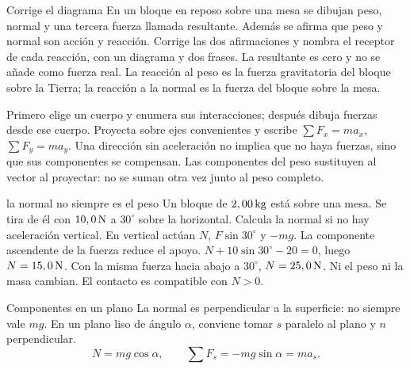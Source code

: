 \documentclass[11pt,a4paper]{article}
\begin{document}
\begin{exercisebox}{Corrige el diagrama}
En un bloque en reposo sobre una mesa se dibujan peso, normal y una tercera fuerza llamada resultante. Adem\'as se afirma que peso y normal son acci\'on y reacci\'on. Corrige las dos afirmaciones y nombra el receptor de cada reacci\'on, con un diagrama y dos frases.
\solutionblock La resultante es cero y no se a\~nade como fuerza real. La reacci\'on al peso es la fuerza gravitatoria del bloque sobre la Tierra; la reacci\'on a la normal es la fuerza del bloque sobre la mesa.
\end{exercisebox}



Primero elige un cuerpo y enumera sus interacciones; despu\'es dibuja fuerzas
desde ese cuerpo. Proyecta sobre ejes convenientes y escribe
$\sum F_x=ma_x$, $\sum F_y=ma_y$. Una direcci\'on sin aceleraci\'on no implica que
no haya fuerzas, sino que sus componentes se compensan.
Las componentes del peso sustituyen al vector al proyectar: no se suman otra vez
junto al peso completo.

\begin{examplebox}{la normal no siempre es el peso}
 Un bloque de $2,00\,\mathrm{kg}$ est\'a sobre una mesa.
Se tira de \'el con $10,0\,\mathrm{N}$ a $30^\circ$ sobre la horizontal.
Calcula la normal si no hay aceleraci\'on vertical.
\solutionblock
{} En vertical act\'uan $N$, $F\sin30^\circ$ y $-mg$.
La componente ascendente de la fuerza reduce el apoyo.
 $N+10\sin30^\circ-20=0$, luego $N=15,0\,\mathrm{N}$.
 Con la misma fuerza hacia abajo a $30^\circ$, $N=25,0\,\mathrm{N}$.
Ni el peso ni la masa cambian. El contacto es compatible con $N>0$.
\end{examplebox}

\begin{lessoncard}{Componentes en un plano}
La normal es perpendicular a la superficie: no siempre vale $mg$. En un plano liso de \'angulo $\alpha$, conviene tomar $s$ paralelo al plano y $n$ perpendicular.
\[
N=mg\cos\alpha,\qquad \sum F_s=-mg\sin\alpha=ma_s.
\]
\begin{center}
\end{center}
\end{lessoncard}
\end{document}
